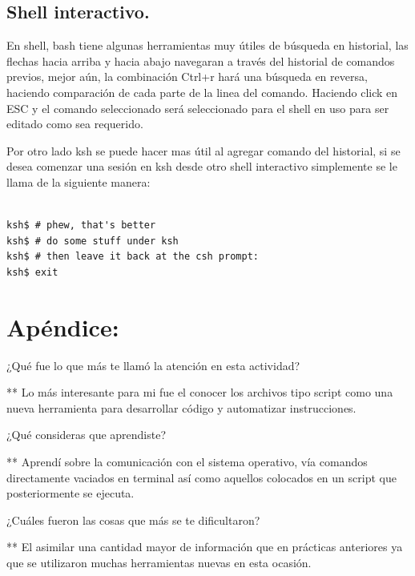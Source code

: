 \documentclass{article} %
\begin{document}
\subsection{Shell interactivo.}

En shell, bash tiene algunas herramientas muy útiles de búsqueda en historial, las flechas hacia arriba y hacia abajo navegaran a través del historial de comandos previos, mejor aún, la combinación Ctrl+r hará una búsqueda en reversa, haciendo comparación de cada parte de la linea del comando. Haciendo click en ESC y el comando seleccionado será seleccionado para el shell en uso para ser editado como sea requerido.

Por otro lado ksh se puede hacer mas útil al agregar comando del historial, si se desea comenzar una sesión en ksh desde otro shell interactivo simplemente se le llama de la siguiente manera:

\begin{verbatim} 

ksh$ # phew, that's better
ksh$ # do some stuff under ksh
ksh$ # then leave it back at the csh prompt:
ksh$ exit

\end{verbatim}


\section*{Apéndice:}

\hspace{0.45 cm} ¿Qué fue lo que más te llamó la atención en esta actividad?
\vspace{0.5 cm}

** Lo más interesante para mi fue el conocer los archivos tipo script como una nueva herramienta para desarrollar código y automatizar instrucciones. 

\vspace{0.5 cm}

¿Qué consideras que aprendiste?
\vspace{0.5 cm}

** Aprendí sobre la comunicación con el sistema operativo, vía comandos directamente vaciados en terminal así como aquellos colocados en un script que posteriormente se ejecuta.

\vspace{0.5 cm}

¿Cuáles fueron las cosas que más se te dificultaron?
\vspace{0.5 cm}

** El asimilar una cantidad mayor de información que en prácticas anteriores ya que se utilizaron muchas herramientas nuevas en esta ocasión.
\end{document}
